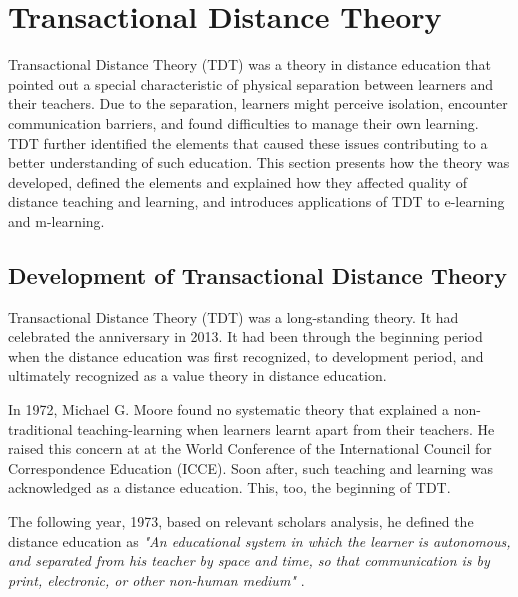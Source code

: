 \newpage 
\section {Transactional Distance Theory} 

Transactional Distance Theory (TDT) was a theory in distance education that pointed out a special characteristic of physical separation between learners and their teachers. Due to the separation, learners might perceive isolation, encounter communication barriers, and found difficulties to manage their own learning. TDT further identified the elements that caused these issues contributing to a better understanding of such education. This section presents how the theory was developed, defined the elements and explained how they affected quality of distance teaching and learning, and introduces applications of TDT to e-learning and m-learning. 


\subsection{Development of Transactional Distance Theory}

Transactional Distance Theory (TDT) was a long-standing  theory. It had celebrated the  anniversary in 2013. It had been through the beginning period when the distance education was first recognized, to development period, and ultimately recognized as a value theory in distance education. 

In 1972, Michael G. Moore \cite{moore1972learner} found no systematic theory that explained a non-traditional teaching-learning when learners learnt apart from their teachers. He raised this concern at at the World Conference of the International Council for Correspondence Education (ICCE). Soon after, such teaching and learning was acknowledged as a distance education. This, too, the beginning of TDT. 

The following year, 1973, based on relevant scholars analysis, he defined the distance education as 
\newline 
\newline \textit{"An educational system in which the learner is autonomous, and separated from his teacher by space and time, so that communication is by print, electronic, or other non-human medium"} \cite[pp. 663]{moore1973toward}.
\newline 

